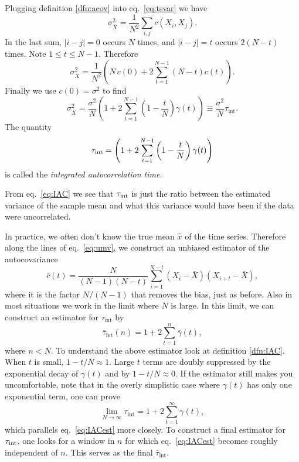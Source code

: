 Plugging definition \eqref{dfn:acov} into eq.~\eqref{eq:tsvar} we have 
\begin{equation}
  \sigma^2_{\bar{X}}=\frac{1}{N^2}\sum_{i,j}c(X_i,X_j).
\end{equation}
In the last sum, $|i-j|=0$ occurs $N$ times, and $|i-j|=t$ occurs
$2(N-t)$ times. Note $1\leq t\leq N-1$. Therefore
\begin{equation}
  \sigma^2_{\bar{X}}=\frac{1}{N^2}
    \left(N\,c(0)+2\sum_{t=1}^{N-1}(N-t)c(t)\right).
\end{equation}
Finally we use $c(0)=\sigma^2$ to find
\begin{equation}\label{eq:IAC}
  \sigma^2_{\bar{X}}
    =\frac{\sigma^2}{N}\left(1+2\sum_{t=1}^{N-1}\left(1-\frac{t}{N}\right)
     \gamma(t)\right)
    \equiv\frac{\sigma^2}{N}\tau_\text{int}.
\end{equation}
The quantity
\begin{equation}\label{dfn:IAC}\index{autocorrelation time!integrated}
  \tauint=\left(1+2\sum_{t=1}^{N-1}\left(1-\frac{t}{N}\right)
   \gamma(t)\right)
\end{equation}
is called the {\it integrated autocorrelation time}.

From eq.~\eqref{eq:IAC} we see that $\tau_\text{int}$ is just the ratio between the
estimated variance of the sample mean and what this variance would have been 
if the data were uncorrelated. 

In practice, we often don't know the true mean $\hat{x}$ of the time series.
Therefore along the lines of eq.~\eqref{eq:umv}, we construct an unbiased
estimator of the autocovariance
\begin{equation}
  \bar{c}(t)=\frac{N}{(N-1)(N-t)}
    \sum_{i=1}^{N-t}(X_i-\bar{X})(X_{i+t}-\bar{X}),
\end{equation}
where it is the factor $N/(N-1)$ that removes the bias, just as before.
Also in most situations we work in the limit where $N$ is large. In this
limit, we can construct an estimator for $\tau_\text{int}$ by
\begin{equation}\label{eq:IACest}
  \bar{\tau}_\text{int}(n)=1+2\sum_{t=1}^n\bar{\gamma}(t),
\end{equation}
where $n<N$. To understand the above estimator look at definition
\eqref{dfn:IAC}. When $t$ is small, $1-t/N\approx 1$. Large $t$ terms
are doubly suppressed by the exponential decay of $\gamma(t)$ and
by $1-t/N\approx 0$. If the estimator still makes you uncomfortable,
note that in the overly simplistic case where
$\gamma(t)$ has only one exponential term, one can prove
\begin{equation}
  \lim_{N\to\infty}\tau_\text{int}=1+2\sum_{t=1}^\infty\gamma(t),
\end{equation}
which parallels eq.~\eqref{eq:IACest} more closely. To construct a final
estimator for $\tau_\text{int}$, one looks for a window in $n$ for which
eq.~\eqref{eq:IACest} becomes roughly independent of $n$. This serves
as the final $\bar{\tau}_\text{int}$.



